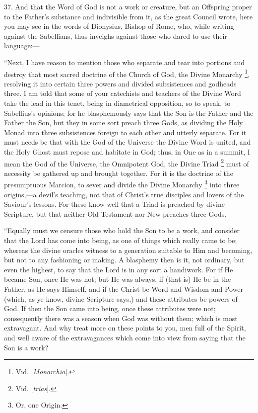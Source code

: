 37. And that the Word of God
is not a work or creature, but an Offspring proper to the Father's
substance and indivisible from it, as the great Council wrote, here
you may see in the words of Dionysius, Bishop of Rome, who, while
writing against the Sabellians, thus inveighs against those who dared
to use their language:—


``Next, I have reason to
mention those who separate and tear into portions and destroy that
most sacred doctrine of the Church of God, the Divine Monarchy \footnote{Vid. [\emph{Monarchia}].}, resolving it into certain three powers and divided
subsistences and godheads three. I am told that some of your
catechists and teachers of the Divine Word take the lead in this
tenet, being in diametrical opposition, so to speak, to Sabellius's
opinions; for he blasphemously says that the Son is the Father and the
Father the Son, but they in some sort preach three Gods, as dividing
the Holy Monad into three subsistences foreign to each other and
utterly separate. For it must needs be that with the God of the
Universe the Divine Word is united, and the Holy Ghost must repose and
habitate in God; thus, in One as in a summit, I mean the God of the
Universe, the Omnipotent God, the Divine Triad \footnote{Vid. [\emph{trias}].} must of necessity be gathered up and brought together. For it
is the doctrine of the presumptuous Marcion, to sever and divide the
Divine Monarchy \footnote{Or, one Origin.} into
three origins,—a devil's teaching, not that of Christ's true
disciples and lovers of the Saviour's lessons. For these know well
that a Triad is preached by divine Scripture, but that neither Old
Testament nor New preaches three Gods.

``Equally must we censure those
who hold the Son to be a work, and consider that the Lord has come
into being, as one of things which really came to be; whereas the
divine oracles witness to a generation suitable to Him and becoming,
but not to any fashioning or making. A blasphemy then is it, not
ordinary, but even the highest, to say that the Lord is in any sort a
handiwork. For if He became Son, once He was not; but He was always,
if (that is) He be in the Father, as He says Himself, and if the
Christ be Word and Wisdom and Power (which, as ye know, divine
Scripture says,) and these attributes be powers of God. If then the
Son came into being, once these attributes were not; consequently
there was a season when God was without them; which is most
extravagant. And why treat more on these points to you, men full of
the Spirit, and well aware of the extravagances which come into view
from saying that the Son is a work?


